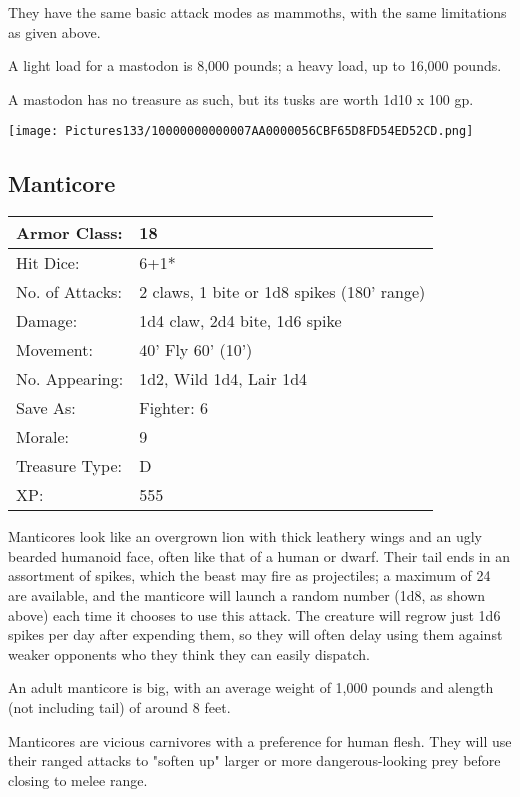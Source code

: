 \documentclass[a4paper,twoside,openany,10pt]{book}
\begin{document}
\begin{multicols}{2}
They have the same basic attack modes as mammoths, with the same limitations as given above.

A light load for a mastodon is 8,000 pounds; a heavy load, up to 16,000 pounds.

A mastodon has no treasure as such, but its tusks are worth 1d10 x 100 gp.

\begin{center} \texttt{[image: Pictures133/10000000000007AA0000056CBF65D8FD54ED52CD.png]} \end{center}


\subsection*{Manticore}\label{manticore}

\begin{tabularx}{0.50\textwidth}{@{}lX@{}}
Armor Class: & 18 \\\hline
Hit Dice: & 6+1* \\\hline
No. of Attacks: & 2 claws, 1 bite or 1d8 spikes (180' range) \\\hline
Damage: & 1d4 claw, 2d4 bite, 1d6 spike \\\hline
Movement: & 40' Fly 60' (10') \\\hline
No. Appearing: & 1d2, Wild 1d4, Lair 1d4 \\\hline
Save As: & Fighter: 6 \\\hline
Morale: & 9 \\\hline
Treasure Type: & D \\\hline
XP: & 555 \\\hline
\end{tabularx}\medskip

Manticores look like an overgrown lion with thick leathery wings and an ugly bearded humanoid face, often like that of a human or dwarf. Their tail ends in an assortment of spikes, which the beast may fire as projectiles; a maximum of 24 are available, and the manticore will launch a random number (1d8, as shown above) each time it chooses to use this attack. The creature will regrow just 1d6 spikes per day after expending them, so they will often delay using them against weaker opponents who they think they can easily dispatch.

An adult manticore is big, with an average weight of 1,000 pounds and alength (not including tail) of around 8 feet.

Manticores are vicious carnivores with a preference for human flesh. They will use their ranged attacks to "soften up" larger or more dangerous-looking prey before closing to melee range.


\end{multicols}
\end{document}
